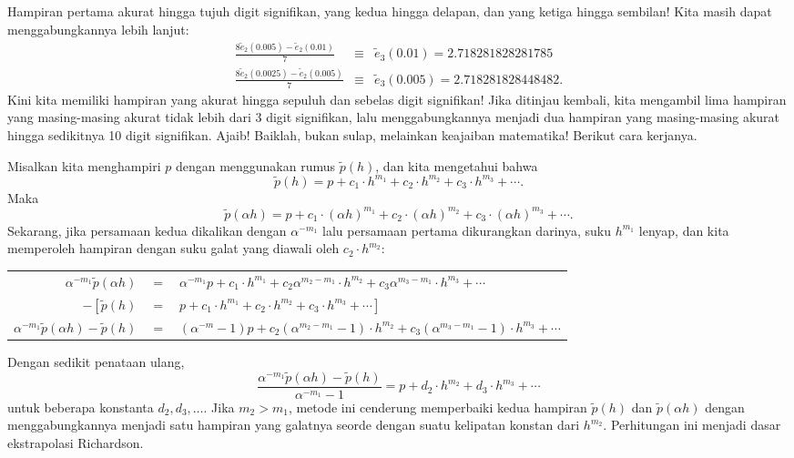 Hampiran pertama akurat hingga tujuh digit signifikan, yang kedua
hingga delapan, dan yang ketiga hingga sembilan! Kita masih dapat
menggabungkannya lebih lanjut:
\begin{eqnarray}
\frac{8\tilde{e}_{2}(0.005)-\tilde{e}_{2}(0.01)}{7} & \equiv & \tilde{e}_{3}(0.01)=2.718281828281785\nonumber \\
\frac{8\tilde{e}_{2}(0.0025)-\tilde{e}_{2}(0.005)}{7} & \equiv & \tilde{e}_{3}(0.005)=2.718281828448482.\label{eq:richardsonC4}
\end{eqnarray}
Kini kita memiliki hampiran yang akurat hingga sepuluh dan sebelas
digit signifikan! Jika ditinjau kembali, kita mengambil lima hampiran
yang masing-masing akurat tidak lebih dari 3 digit signifikan, lalu
menggabungkannya menjadi dua hampiran yang masing-masing akurat hingga
sedikitnya 10 digit signifikan. Ajaib! Baiklah, bukan sulap, melainkan
keajaiban matematika! Berikut cara kerjanya.

Misalkan kita menghampiri $p$ dengan menggunakan rumus $\tilde{p}(h)$,
dan kita mengetahui bahwa
\[
\tilde{p}(h)=p+c_{1}\cdot h^{m_{1}}+c_{2}\cdot h^{m_{2}}+c_{3}\cdot h^{m_{3}}+\cdots.
\]
Maka
\[
\tilde{p}\left(\alpha h\right)=p+c_{1}\cdot\left(\alpha h\right)^{m_{1}}+c_{2}\cdot(\alpha h)^{m_{2}}+c_{3}\cdot(\alpha h)^{m_{3}}+\cdots.
\]
Sekarang, jika persamaan kedua dikalikan dengan $\alpha^{-m_{1}}$
lalu persamaan pertama dikurangkan darinya, suku $h^{m_{1}}$ lenyap,
dan kita memperoleh hampiran dengan suku galat yang diawali oleh $c_{2}\cdot h^{m_{2}}$:

\begin{center}
\begin{tabular}{rcl}
$\alpha^{-m_{1}}\tilde{p}\left(\alpha h\right)$ & $=$ & $\alpha^{-m_{1}}p+c_{1}\cdot h^{m_{1}}+c_{2}\alpha^{m_{2}-m_{1}}\cdot h^{m_{2}}+c_{3}\alpha^{m_{3}-m_{1}}\cdot h^{m_{3}}+\cdots$\tabularnewline
$-\left[\tilde{p}(h)\right.$ & $=$ & $\left.p+c_{1}\cdot h^{m_{1}}+c_{2}\cdot h^{m_{2}}+c_{3}\cdot h^{m_{3}}+\cdots\right]$\tabularnewline
\hline 
$\alpha^{-m_{1}}\tilde{p}\left(\alpha h\right)-\tilde{p}(h)$ & $=$ & $(\alpha^{-m}-1)p+c_{2}(\alpha^{m_{2}-m_{1}}-1)\cdot h^{m_{2}}+c_{3}(\alpha^{m_{3}-m_{1}}-1)\cdot h^{m_{3}}+\cdots$\tabularnewline
\end{tabular}
\par\end{center}

\noindent Dengan sedikit penataan ulang,
\begin{equation}
\frac{\alpha^{-m_{1}}\tilde{p}\left(\alpha h\right)-\tilde{p}(h)}{\alpha^{-m_{1}}-1}=p+d_{2}\cdot h^{m_{2}}+d_{3}\cdot h^{m_{3}}+\cdots\label{eq:richardsonBasis}
\end{equation}
untuk beberapa konstanta $d_{2},d_{3},\ldots$. Jika $m_{2}>m_{1}$,
metode ini cenderung memperbaiki kedua hampiran $\tilde{p}(h)$ dan
$\tilde{p}\left(\alpha h\right)$ dengan menggabungkannya menjadi
satu hampiran yang galatnya seorde dengan suatu kelipatan konstan
dari $h^{m_{2}}$. Perhitungan ini menjadi dasar ekstrapolasi Richardson.

